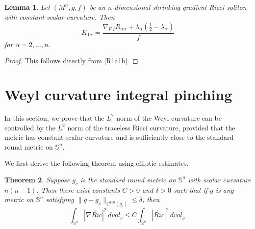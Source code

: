 \documentclass[a4, 12pt]{amsart}
\theoremstyle{plain}
\newtheorem{theo}{Theorem}[section]
\newtheorem{lem}[theo]{Lemma}
\begin{document}
\begin{lem}\label{sectional-curvature}
	Let $(M^n, g, f)$ be an $n$-dimensional shrinking gradient Ricci soliton with constant scalar curvature. Then
	\begin{equation}\label{k1a}
		K_{1\alpha} = \frac{\nabla_{\nabla f}R_{\alpha\alpha} + \lambda_\alpha\left(\frac{1}{2} - \lambda_\alpha\right)}{f}
	\end{equation}
	for $\alpha = 2, \ldots, n$.
\end{lem}
\begin{proof}
	This follows directly from \eqref{R1a1b}.
\end{proof}




\section{Weyl curvature integral pinching}
In this section, we prove that the $L^2$ norm of the Weyl curvature can be controlled by the $L^2$ norm of the traceless Ricci curvature, provided that the metric has constant scalar curvature and is sufficiently close to the standard round metric on $\mathbb{S}^n$.

We first derive the following theorem using elliptic estimates.

\begin{theo}\label{thm:pinching-estimate}
	Suppose $g_c$ is the standard round metric on $\mathbb{S}^n$ with scalar curvature $n(n-1)$. Then there exist constants $C > 0$ and $\delta > 0$ such that if $g$ is any metric on $\mathbb{S}^n$ satisfying $\|g - g_c\|_{C^{100}(g_c)} \leq \delta$, then
	\[
	\int_{\mathbb{S}^n} |\nabla \mathring{Ric}|^2 \, dvol_g \leq C \int_{\mathbb{S}^n} |\mathring{Ric}|^2 \, dvol_g.
	\]
\end{theo}
\end{document}
